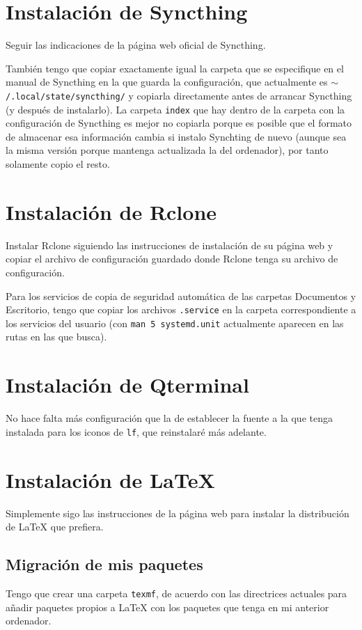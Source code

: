 \documentclass{article}
\begin{document}
    \section{Instalación de Syncthing}
    Seguir las indicaciones de la página web oficial de Syncthing.

    También tengo que copiar exactamente igual la carpeta que se especifique en
    el manual de Syncthing en la que guarda la configuración, que actualmente es
    \texttt{$\sim$/.local/state/syncthing/} y copiarla directamente antes de
    arrancar Syncthing (y después de instalarlo). La carpeta \texttt{index} que
    hay dentro de la carpeta con la configuración de Syncthing es mejor no
    copiarla porque es posible que el formato de almacenar esa información
    cambia si instalo Synchting de nuevo (aunque sea la misma versión porque
    mantenga actualizada la del ordenador), por tanto solamente copio el resto.

    \section{Instalación de Rclone}
    Instalar Rclone siguiendo las instrucciones de instalación de su página web
    y copiar el archivo de configuración guardado donde Rclone tenga su archivo
    de configuración.

    Para los servicios de copia de seguridad automática de las carpetas
    Documentos y Escritorio, tengo que copiar los archivos \texttt{.service} en
    la carpeta correspondiente a los servicios del usuario (con
    \texttt{man 5 systemd.unit} actualmente aparecen en las rutas en las que
    busca).

    \section{Instalación de Qterminal}
    No hace falta más configuración que la de establecer la fuente a la que
    tenga instalada para los iconos de \texttt{lf}, que reinstalaré más adelante.

    \section{Instalación de \LaTeX{}}
    Simplemente sigo las instrucciones de la página web para instalar la
    distribución de \LaTeX{} que prefiera.

    \subsection{Migración de mis paquetes}
    Tengo que crear una carpeta \texttt{texmf}, de acuerdo con las directrices
    actuales para añadir paquetes propios a LaTeX con los paquetes que tenga en
    mi anterior ordenador.
\end{document}
